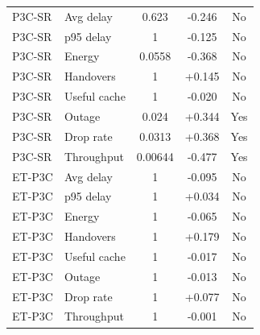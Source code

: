 \begin{table}[!t]
\begin{tabular}{llccc}
P3C-SR & Avg delay & 0.623 & -0.246 & No \\
P3C-SR & p95 delay & 1 & -0.125 & No \\
P3C-SR & Energy & 0.0558 & -0.368 & No \\
P3C-SR & Handovers & 1 & +0.145 & No \\
P3C-SR & Useful cache & 1 & -0.020 & No \\
P3C-SR & Outage & 0.024 & +0.344 & Yes \\
P3C-SR & Drop rate & 0.0313 & +0.368 & Yes \\
P3C-SR & Throughput & 0.00644 & -0.477 & Yes \\
ET-P3C & Avg delay & 1 & -0.095 & No \\
ET-P3C & p95 delay & 1 & +0.034 & No \\
ET-P3C & Energy & 1 & -0.065 & No \\
ET-P3C & Handovers & 1 & +0.179 & No \\
ET-P3C & Useful cache & 1 & -0.017 & No \\
ET-P3C & Outage & 1 & -0.013 & No \\
ET-P3C & Drop rate & 1 & +0.077 & No \\
ET-P3C & Throughput & 1 & -0.001 & No \\
\bottomrule
\end{tabular}
\end{table}
